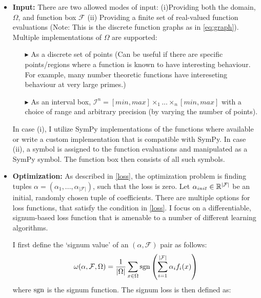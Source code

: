 \begin{itemize}
    \item 
        \textbf{Input:} There are two allowed modes of input: (i)Providing both the domain, $\Omega$, and function box $\mathcal{F}$ (ii) Providing a finite set of real-valued function evaluations (Note: This is the discrete function graphs as in \ref{eq:graph}). Multiple implementations of $\Omega$ are supported: 
          \begin{itemize}
            \item[$\blacktriangleright$] As a discrete set of points (Can be useful if there are specific points/regions where a function is known to have interesting behaviour. For example, many number theoretic functions have intereseting behaviour at very large primes.)
            \item[$\blacktriangleright$] As an interval box, $\mathcal{I}^n = [min, max]\times_1...\times_n[min, max]$ with a choice of range and arbitrary precision (by varying the number of points).
          \end{itemize}
          In case (i), I utilize SymPy \cite{10.7717/peerj-cs.103} implementations of the functions where available or write a custom implementation that is compatible with SymPy. In case (ii), a symbol is assigned to the function evaluations and manipulated as a SymPy symbol. The function box then consists of all such symbols.
    \item 
        \textbf{Optimization:} As described in \ref{loss}, the optimization problem is finding tuples $\alpha = (\alpha_1,...,\alpha_{|\mathcal{F}|})$, such that the loss is zero. Let $\alpha_{init}\in\mathbb{R}^{|\mathcal{F}|}$ be an initial, randomly chosen tuple of coefficients.
        There are multiple options for loss functions, that satisfy the condition in \ref{loss}. I focus on a differentiable, signum-based loss function that is amenable to a number of different learning algorithms.
        \begin{definition}
            \label{def:signum-loss}
            I first define the `signum value' of an $(\alpha, \mathcal{F})$ pair as follows:
            \begin{equation*}
                \omega(\alpha, \mathcal{F}, \Omega) = \frac{1}{|\Omega|}\sum_{x\in\Omega} \operatorname{sgn}\left(\sum_{i=1}^{|\mathcal{F}|}\alpha_i f_i(x)\right)
            \end{equation*}
            where $\operatorname{sgn}$ is the signum function. The signum loss is then defined as:
            \begin{equation*}

\end{equation*}
\end{definition}
\end{itemize}
